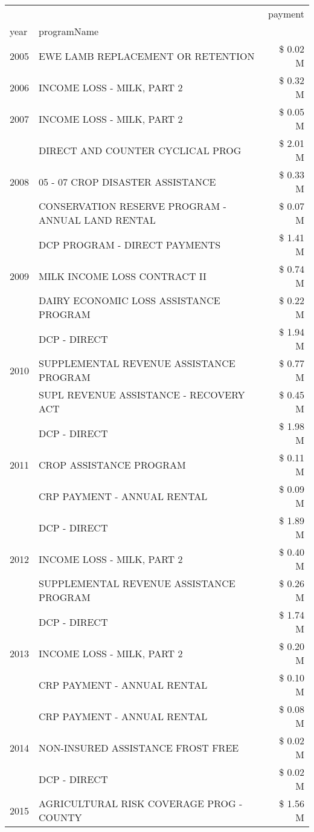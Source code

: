 \begin{tabular}{llr}
\toprule
 &  & payment \\
year & programName &  \\
\midrule
2005 & EWE LAMB REPLACEMENT OR RETENTION & \$ 0.02 M \\
\cline{1-3}
2006 & INCOME LOSS - MILK, PART 2 & \$ 0.32 M \\
\cline{1-3}
2007 & INCOME LOSS - MILK, PART 2 & \$ 0.05 M \\
\cline{1-3}
\multirow[t]{3}{*}{2008} & DIRECT AND COUNTER CYCLICAL PROG & \$ 2.01 M \\
 & 05 - 07 CROP DISASTER ASSISTANCE & \$ 0.33 M \\
 & CONSERVATION RESERVE PROGRAM - ANNUAL LAND RENTAL & \$ 0.07 M \\
\cline{1-3}
\multirow[t]{3}{*}{2009} & DCP PROGRAM - DIRECT PAYMENTS & \$ 1.41 M \\
 & MILK INCOME LOSS CONTRACT II & \$ 0.74 M \\
 & DAIRY ECONOMIC LOSS ASSISTANCE PROGRAM & \$ 0.22 M \\
\cline{1-3}
\multirow[t]{3}{*}{2010} & DCP - DIRECT & \$ 1.94 M \\
 & SUPPLEMENTAL REVENUE ASSISTANCE PROGRAM & \$ 0.77 M \\
 & SUPL REVENUE ASSISTANCE - RECOVERY ACT & \$ 0.45 M \\
\cline{1-3}
\multirow[t]{3}{*}{2011} & DCP - DIRECT & \$ 1.98 M \\
 & CROP ASSISTANCE PROGRAM & \$ 0.11 M \\
 & CRP PAYMENT - ANNUAL RENTAL & \$ 0.09 M \\
\cline{1-3}
\multirow[t]{3}{*}{2012} & DCP - DIRECT & \$ 1.89 M \\
 & INCOME LOSS - MILK, PART 2 & \$ 0.40 M \\
 & SUPPLEMENTAL REVENUE ASSISTANCE PROGRAM & \$ 0.26 M \\
\cline{1-3}
\multirow[t]{3}{*}{2013} & DCP - DIRECT & \$ 1.74 M \\
 & INCOME LOSS - MILK, PART 2 & \$ 0.20 M \\
 & CRP PAYMENT - ANNUAL RENTAL & \$ 0.10 M \\
\cline{1-3}
\multirow[t]{3}{*}{2014} & CRP PAYMENT - ANNUAL RENTAL & \$ 0.08 M \\
 & NON-INSURED ASSISTANCE FROST FREE & \$ 0.02 M \\
 & DCP - DIRECT & \$ 0.02 M \\
\cline{1-3}
\multirow[t]{3}{*}{2015} & AGRICULTURAL RISK COVERAGE PROG - COUNTY & \$ 1.56 M \\

\end{tabular}
